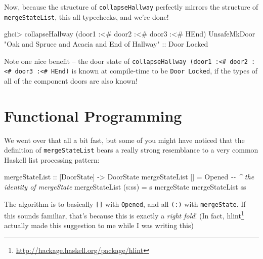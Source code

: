 \documentclass[]{article}
\newenvironment{Shaded}{}{}
\newcommand{\CommentTok}[1]{\textcolor[rgb]{0.38,0.63,0.69}{\textit{#1}}}
\newcommand{\DataTypeTok}[1]{\textcolor[rgb]{0.56,0.13,0.00}{#1}}
\newcommand{\NormalTok}[1]{#1}
\newcommand{\OperatorTok}[1]{\textcolor[rgb]{0.40,0.40,0.40}{#1}}
\newcommand{\OtherTok}[1]{\textcolor[rgb]{0.00,0.44,0.13}{#1}}
\newcommand{\StringTok}[1]{\textcolor[rgb]{0.25,0.44,0.63}{#1}}
\renewcommand{\href}[2]{#2\footnote{\url{#1}}}
\begin{document}
Now, because the structure of \texttt{collapseHallway} perfectly mirrors the
structure of \texttt{mergeStateList}, this all typechecks, and we're done!

\begin{Shaded}
\begin{Highlighting}[]
\NormalTok{ghci}\OperatorTok{\textgreater{}}\NormalTok{ collapseHallway (door1 }\OperatorTok{:\textless{}\#}\NormalTok{ door2 }\OperatorTok{:\textless{}\#}\NormalTok{ door3 }\OperatorTok{:\textless{}\#} \DataTypeTok{HEnd}\NormalTok{)}
\DataTypeTok{UnsafeMkDoor} \StringTok{"Oak and Spruce and Acacia and End of Hallway"}
\OtherTok{    ::} \DataTypeTok{Door} \DataTypeTok{\textquotesingle{}Locked}
\end{Highlighting}
\end{Shaded}

Note one nice benefit -- the door state of
\texttt{collapseHallway\ (door1\ :\textless{}\#\ door2\ :\textless{}\#\ door3\ :\textless{}\#\ HEnd)}
is known at compile-time to be \texttt{Door\ \textquotesingle{}Locked}, if the
types of all of the component doors are also known!

\section{Functional Programming}\label{functional-programming}

We went over that all a bit fast, but some of you might have noticed that the
definition of \texttt{mergeStateList} bears a really strong resemblance to a
very common Haskell list processing pattern:

\begin{Shaded}
\begin{Highlighting}[]
\OtherTok{mergeStateList ::}\NormalTok{ [}\DataTypeTok{DoorState}\NormalTok{] }\OtherTok{{-}\textgreater{}} \DataTypeTok{DoorState}
\NormalTok{mergeStateList []     }\OtherTok{=} \DataTypeTok{Opened}               \CommentTok{{-}{-} \^{} the identity of mergeState}
\NormalTok{mergeStateList (s}\OperatorTok{:}\NormalTok{ss) }\OtherTok{=}\NormalTok{ s }\OtherTok{\textasciigrave{}mergeState\textasciigrave{}}\NormalTok{ mergeStateList ss}
\end{Highlighting}
\end{Shaded}

The algorithm is to basically \texttt{{[}{]}} with \texttt{Opened}, and all
\texttt{(:)} with \texttt{mergeState}. If this sounds familiar, that's because
this is exactly a \emph{right fold}! (In fact,
\href{http://hackage.haskell.org/package/hlint}{hlint} actually made this
suggestion to me while I was writing this)
\end{document}
